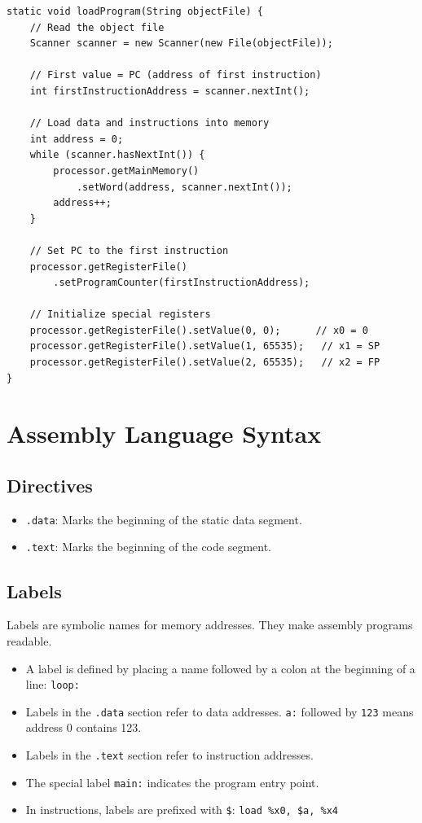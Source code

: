 \documentclass[12pt,a4paper]{article}
\begin{document}
\begin{lstlisting}[style=javastyle, caption={Loading the program (conceptual)}]
static void loadProgram(String objectFile) {
    // Read the object file
    Scanner scanner = new Scanner(new File(objectFile));

    // First value = PC (address of first instruction)
    int firstInstructionAddress = scanner.nextInt();

    // Load data and instructions into memory
    int address = 0;
    while (scanner.hasNextInt()) {
        processor.getMainMemory()
            .setWord(address, scanner.nextInt());
        address++;
    }

    // Set PC to the first instruction
    processor.getRegisterFile()
        .setProgramCounter(firstInstructionAddress);

    // Initialize special registers
    processor.getRegisterFile().setValue(0, 0);      // x0 = 0
    processor.getRegisterFile().setValue(1, 65535);   // x1 = SP
    processor.getRegisterFile().setValue(2, 65535);   // x2 = FP
}
\end{lstlisting}

\section{Assembly Language Syntax}

\subsection{Directives}

\begin{itemize}
    \item \texttt{.data}: Marks the beginning of the static data segment.
    \item \texttt{.text}: Marks the beginning of the code segment.
\end{itemize}

\subsection{Labels}

Labels are symbolic names for memory addresses. They make assembly programs readable.

\begin{itemize}
    \item A label is defined by placing a name followed by a colon at the beginning of a line: \texttt{loop:}
    \item Labels in the \texttt{.data} section refer to data addresses. \texttt{a:} followed by \texttt{123} means address 0 contains 123.
    \item Labels in the \texttt{.text} section refer to instruction addresses.
    \item The special label \texttt{main:} indicates the program entry point.
    \item In instructions, labels are prefixed with \texttt{\$}: \texttt{load \%x0, \$a, \%x4}
\end{itemize}
\end{document}
